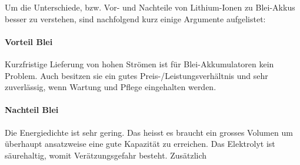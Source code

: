 Um die Unterschiede, bzw. Vor- und Nachteile von Lithium-Ionen zu Blei-Akkus besser zu verstehen, sind nachfolgend kurz einige Argumente aufgelistet:

\paragraph{Vorteil Blei}

Kurzfristige Lieferung von hohen Strömen ist für Blei-Akkumulatoren kein Problem. Auch besitzen sie ein gutes Preis-/Leistungsverhältnis und sehr zuverlässig, wenn Wartung und Pflege eingehalten werden.

\paragraph{Nachteil Blei}

Die Energiedichte ist sehr gering. Das heisst es braucht ein grosses Volumen um überhaupt ansatzweise eine gute Kapazität zu erreichen. Das Elektrolyt ist säurehaltig, womit Verätzungsgefahr besteht. Zusätzlich